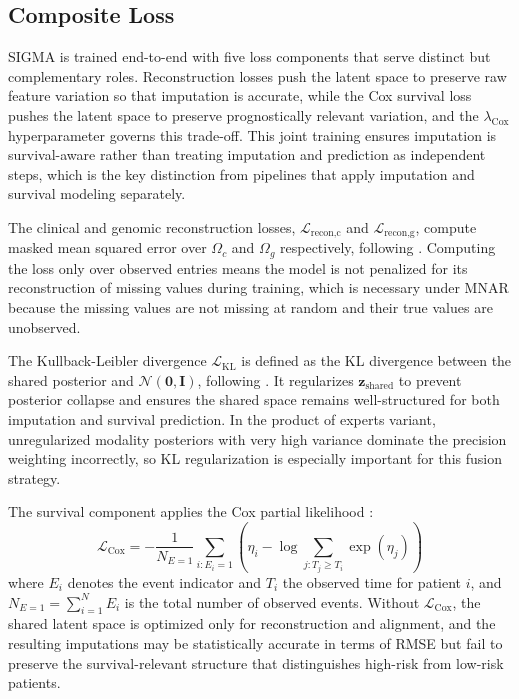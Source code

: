 \documentclass[final,3p,times,authoryear]{elsarticle}
\newcommand{\LreconC}{\mathcal{L}_{\text{recon,c}}}
\newcommand{\LreconG}{\mathcal{L}_{\text{recon,g}}}
\newcommand{\LKL}{\mathcal{L}_{\text{KL}}}
\newcommand{\LCox}{\mathcal{L}_{\text{Cox}}}
\begin{document}
\subsection{Composite Loss}
SIGMA is trained end-to-end with five loss components that serve distinct but complementary roles. Reconstruction losses push the latent space to preserve raw feature variation so that imputation is accurate, while the Cox survival loss pushes the latent space to preserve prognostically relevant variation, and the $\lambda_{\text{Cox}}$ hyperparameter governs this trade-off. This joint training ensures imputation is survival-aware rather than treating imputation and prediction as independent steps, which is the key distinction from pipelines that apply imputation and survival modeling separately.

The clinical and genomic reconstruction losses, $\LreconC$ and $\LreconG$, compute masked mean squared error over $\Omega_c$ and $\Omega_g$ respectively, following \citet{mnarsvae}. Computing the loss only over observed entries means the model is not penalized for its reconstruction of missing values during training, which is necessary under MNAR because the missing values are not missing at random and their true values are unobserved.

The Kullback-Leibler divergence $\LKL$ is defined as the KL divergence between the shared posterior and $\mathcal{N}(\mathbf{0}, \mathbf{I})$, following \citet{kingma2014auto}. It regularizes $\mathbf{z}_{\text{shared}}$ to prevent posterior collapse and ensures the shared space remains well-structured for both imputation and survival prediction. In the product of experts variant, unregularized modality posteriors with very high variance dominate the precision weighting incorrectly, so KL regularization is especially important for this fusion strategy.

The survival component applies the Cox partial likelihood \citep{cox1972regression}:
\begin{equation}
\LCox = -\frac{1}{N_{E=1}} \sum_{i : E_i=1} \left( \eta_i - \log \sum_{j : T_j \geq T_i} \exp(\eta_j) \right)
\label{eq:cox}
\end{equation}
where $E_i$ denotes the event indicator and $T_i$ the observed time for patient $i$, and $N_{E=1} = \sum_{i=1}^N E_i$ is the total number of observed events. Without $\LCox$, the shared latent space is optimized only for reconstruction and alignment, and the resulting imputations may be statistically accurate in terms of RMSE but fail to preserve the survival-relevant structure that distinguishes high-risk from low-risk patients.
\end{document}
